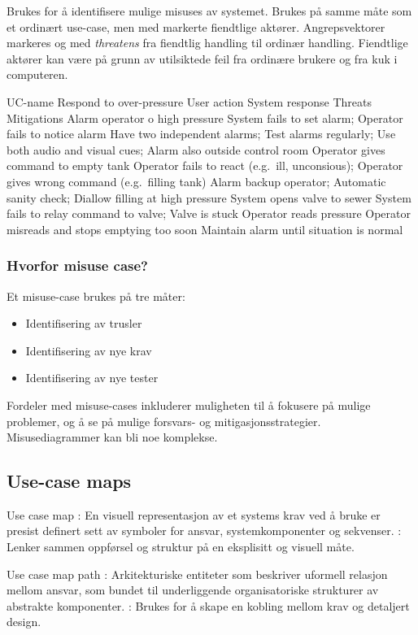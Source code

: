 Brukes for å identifisere mulige misuses av systemet. Brukes på samme
måte som et ordinært use-case, men med markerte fiendtlige aktører.
Angrepsvektorer markeres og med \emph{threatens} fra fiendtlig handling
til ordinær handling. Fiendtlige aktører kan være på grunn av
utilsiktede feil fra ordinære brukere og fra kuk i computeren.

UC-name
Respond to over-pressure
User action
System response
Threats
Mitigations
Alarm operator o high pressure
System fails to set alarm; Operator fails to notice alarm
Have two independent alarms; Test alarms regularly; Use both audio and
visual cues; Alarm also outside control room
Operator gives command to empty tank
Operator fails to react (e.g.~ill, unconsious); Operator gives wrong
command (e.g.~filling tank)
Alarm backup operator; Automatic sanity check; Diallow filling at high
pressure
System opens valve to sewer
System fails to relay command to valve; Valve is stuck
Operator reads pressure
Operator misreads and stops emptying too soon
Maintain alarm until situation is normal
\subsubsection{Hvorfor misuse case?}

Et misuse-case brukes på tre måter:

\begin{itemize}
\item
  Identifisering av trusler
\item
  Identifisering av nye krav
\item
  Identifisering av nye tester
\end{itemize}
Fordeler med misuse-cases inkluderer muligheten til å fokusere på mulige
problemer, og å se på mulige forsvars- og mitigasjonsstrategier.
Misusediagrammer kan bli noe komplekse.

\subsection{Use-case maps}

Use case map : En visuell representasjon av et systems krav ved å bruke
er presist definert sett av symboler for ansvar, systemkomponenter og
sekvenser. : Lenker sammen oppførsel og struktur på en eksplisitt og
visuell måte.

Use case map path : Arkitekturiske entiteter som beskriver uformell
relasjon mellom ansvar, som bundet til underliggende organisatoriske
strukturer av abstrakte komponenter. : Brukes for å skape en kobling
mellom krav og detaljert design.

